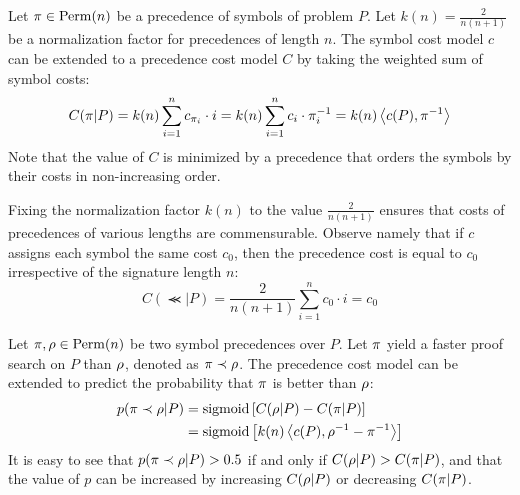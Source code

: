 Let $\pi \in \mathrm{Perm}(n)$ be a precedence of symbols of problem $P$.
Let $k(n) = \frac{2}{n(n+1)}$ be a normalization factor for precedences of length $n$.
The symbol cost model $c$ can be extended to a precedence cost model $C$
by taking the weighted sum of symbol costs:
\begin{equation} \label{eq:model_cost}
C(\pi | P)
= k(n) \sum_{i=1}^n c_{\pi_i} \cdot i
= k(n) \sum_{i=1}^n c_i \cdot \pi^{-1}_i
= k(n) \left<c(P),\pi^{-1}\right>
\end{equation}
Note that the value of $C$ is minimized by a precedence that orders the symbols by their costs in non-increasing order.

Fixing the normalization factor $k(n)$ to the value $\frac{2}{n(n+1)}$
ensures that costs of precedences of various lengths are commensurable.
Observe namely that if $c$ assigns each symbol the same cost $c_0$,
then the precedence cost is equal to $c_0$ irrespective of the signature length $n$:
$$
C(\Prec | P) = \frac{2}{n(n+1)} \sum_{i=1}^n c_0 \cdot i = c_0
$$

Let $\pi, \rho \in \mathrm{Perm}(n)$ be two symbol precedences over $P$.
Let $\pi$ yield a faster proof search on $P$ than $\rho$, denoted as $\pi \prec \rho$.
The precedence cost model can be extended to predict the probability that $\pi$ is better than $\rho$:
\begin{align*}
p(\pi \prec \rho | P)
&= \operatorname{sigmoid} \left[C(\rho | P) - C(\pi | P)\right] \\
&= \operatorname{sigmoid} \left[k(n) \left<c(P),\rho^{-1} - \pi^{-1}\right>\right]
\end{align*}
It is easy to see that $p(\pi \prec \rho | P) > 0.5$ if and only if $C(\rho | P) > C(\pi | P)$,
and that the value of $p$ can be increased by increasing $C(\rho | P)$ or decreasing $C(\pi | P)$.


